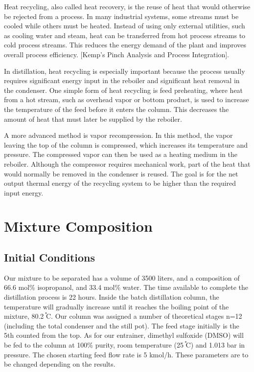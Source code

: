 Heat recycling, also called heat recovery, is the reuse of heat that
would otherwise be rejected from a process. In many industrial systems,
some streams must be cooled while others must be heated. Instead of
using only external utilities, such as cooling water and steam, heat can
be transferred from hot process streams to cold process streams. This
reduces the energy demand of the plant and improves overall process
efficiency. {[}Kemp's Pinch Analysis and Process Integration{]}.

In distillation, heat recycling is especially important because the
process usually requires significant energy input in the reboiler and
significant heat removal in the condenser. One simple form of heat
recycling is feed preheating, where heat from a hot stream, such as
overhead vapor or bottom product, is used to increase the temperature of
the feed before it enters the column. This decreases the amount of heat
that must later be supplied by the reboiler.

A more advanced method is vapor recompression. In this method, the vapor
leaving the top of the column is compressed, which increases its
temperature and pressure. The compressed vapor can then be used as a
heating medium in the reboiler. Although the compressor requires
mechanical work, part of the heat that would normally be removed in the
condenser is reused. The goal is for the net output thermal energy of
the recycling system to be higher than the required input energy.

\chapter{Mixture Composition}\label{mixture-composition}

\section{Initial Conditions}\label{initial-conditions}

Our mixture to be separated has a volume of 3500 liters, and a
composition of 66.6 mol\% isopropanol, and 33.4 mol\% water. The time
available to complete the distillation process is 22 hours. Inside the
batch distillation column, the temperature will gradually increase until
it reaches the boiling point of the mixture, 80.2 ֯C. Our column was
assigned a number of theoretical stages n=12 (including the total
condenser and the still pot). The feed stage initially is the 5th
counted from the top. As for our entrainer, dimethyl sulfoxide (DMSO)
will be fed to the column at 100\% purity, room temperature (25 ֯C) and
1.013 bar in pressure. The chosen starting feed flow rate is 5 kmol/h.
These parameters are to be changed depending on the results.

